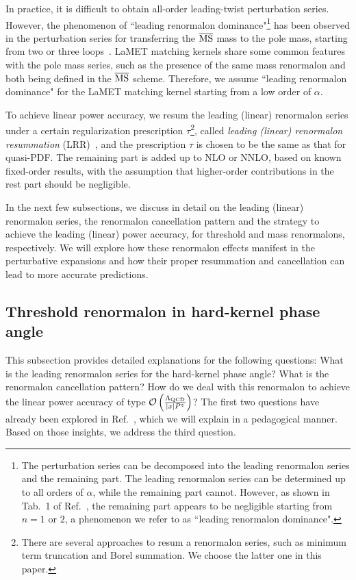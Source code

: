 \documentclass[a4paper,11pt]{article}
\begin{document}
In practice, it is difficult to obtain all-order leading-twist perturbation series. However, the phenomenon of ``leading renormalon dominance"\footnote{The perturbation series can be decomposed into the leading renormalon series and the remaining part. The leading renormalon series can be determined up to all orders of $\alpha$, while the remaining part cannot. However, as shown in Tab.~1 of Ref.~\cite{Pineda:2001zq}, the remaining part appears to be negligible starting from $n=1$ or $2$, a phenomenon we refer to as ``leading renormalon dominance". } has been observed in the perturbation series for transferring the $\overline{\rm MS}$ mass to the pole mass, starting from two or three loops~\cite{Pineda:2001zq}. LaMET matching kernels share some common features with the pole mass series, such as the presence of the same mass renormalon and both being defined in the $\overline{\rm MS}$ scheme. Therefore, we assume ``leading renormalon dominance" for the LaMET matching kernel starting from a low order of $\alpha$. 

To achieve linear power accuracy, we resum the leading (linear) renormalon series under a certain regularization prescription $\tau$\footnote{There are several approaches to resum a renormalon series, such as minimum term truncation and Borel summation. We choose the latter one in this paper.}, called \textit{leading (linear) renormalon resummation} (LRR)~\cite{Zhang:2023bxs}, and the prescription $\tau$ is chosen to be the same as that for quasi-PDF. The remaining part is added up to NLO or NNLO, based on known fixed-order results, with the assumption that higher-order contributions in the rest part should be negligible.

In the next few subsections, we discuss in detail on the leading (linear) renormalon series, the renormalon cancellation pattern and the strategy to achieve the leading (linear) power accuracy, for threshold and mass renormalons, respectively. We will explore how these renormalon effects manifest in the perturbative expansions and how their proper resummation and cancellation can lead to more accurate predictions.


\subsection{Threshold renormalon in hard-kernel phase angle}\label{sec:TRH}
This subsection provides detailed explanations for the following questions: What is the leading renormalon series for the hard-kernel phase angle? What is the renormalon cancellation pattern?
How do we deal with this renormalon to achieve the linear power accuracy of type $\mathcal{O}\left(\frac{\Lambda_{\rm QCD}}{|x| P^z}\right)$?
The first two questions have already been explored in Ref.~\cite{Liu:2023onm}, which we will explain in a pedagogical manner. Based on those insights, we address the third question. 
\end{document}
